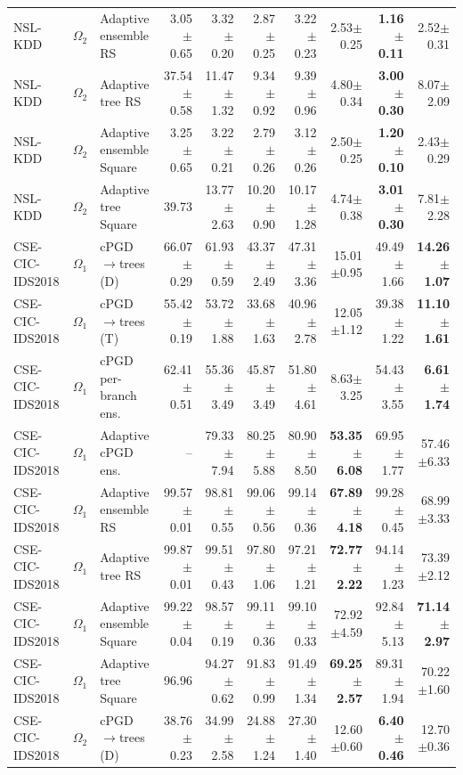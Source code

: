 \begin{tabular}{@{}lllrrrrrrr@{}}
NSL-KDD & $\Omega_2$ & Adaptive ensemble RS & 3.05$\pm$0.65 & 3.32$\pm$0.20 & 2.87$\pm$0.25 & 3.22$\pm$0.23 & 2.53$\pm$0.25 & \textbf{1.16$\pm$0.11} & 2.52$\pm$0.31\\
NSL-KDD & $\Omega_2$ & Adaptive tree RS & 37.54$\pm$0.58 & 11.47$\pm$1.32 & 9.34$\pm$0.92 & 9.39$\pm$0.96 & 4.80$\pm$0.34 & \textbf{3.00$\pm$0.30} & 8.07$\pm$2.09\\
NSL-KDD & $\Omega_2$ & Adaptive ensemble Square & 3.25$\pm$0.65 & 3.22$\pm$0.21 & 2.79$\pm$0.26 & 3.12$\pm$0.26 & 2.50$\pm$0.25 & \textbf{1.20$\pm$0.10} & 2.43$\pm$0.29\\
NSL-KDD & $\Omega_2$ & Adaptive tree Square & 39.73 & 13.77$\pm$2.63 & 10.20$\pm$0.90 & 10.17$\pm$1.28 & 4.74$\pm$0.38 & \textbf{3.01$\pm$0.30} & 7.81$\pm$2.28\\
\midrule
CSE-CIC-IDS2018 & $\Omega_1$ & cPGD$\to$trees (D) & 66.07$\pm$0.29 & 61.93$\pm$0.59 & 43.37$\pm$2.49 & 47.31$\pm$3.36 & 15.01$\pm$0.95 & 49.49$\pm$1.66 & \textbf{14.26$\pm$1.07}\\
CSE-CIC-IDS2018 & $\Omega_1$ & cPGD$\to$trees (T) & 55.42$\pm$0.19 & 53.72$\pm$1.88 & 33.68$\pm$1.63 & 40.96$\pm$2.78 & 12.05$\pm$1.12 & 39.38$\pm$1.22 & \textbf{11.10$\pm$1.61}\\
CSE-CIC-IDS2018 & $\Omega_1$ & cPGD per-branch ens. & 62.41$\pm$0.51 & 55.36$\pm$3.49 & 45.87$\pm$3.49 & 51.80$\pm$4.61 & 8.63$\pm$3.25 & 54.43$\pm$3.55 & \textbf{6.61$\pm$1.74}\\
CSE-CIC-IDS2018 & $\Omega_1$ & Adaptive cPGD ens. & -- & 79.33$\pm$7.94 & 80.25$\pm$5.88 & 80.90$\pm$8.50 & \textbf{53.35$\pm$6.08} & 69.95$\pm$1.77 & 57.46$\pm$6.33\\
CSE-CIC-IDS2018 & $\Omega_1$ & Adaptive ensemble RS & 99.57$\pm$0.01 & 98.81$\pm$0.55 & 99.06$\pm$0.56 & 99.14$\pm$0.36 & \textbf{67.89$\pm$4.18} & 99.28$\pm$0.45 & 68.99$\pm$3.33\\
CSE-CIC-IDS2018 & $\Omega_1$ & Adaptive tree RS & 99.87$\pm$0.01 & 99.51$\pm$0.43 & 97.80$\pm$1.06 & 97.21$\pm$1.21 & \textbf{72.77$\pm$2.22} & 94.14$\pm$1.23 & 73.39$\pm$2.12\\
CSE-CIC-IDS2018 & $\Omega_1$ & Adaptive ensemble Square & 99.22$\pm$0.04 & 98.57$\pm$0.19 & 99.11$\pm$0.36 & 99.10$\pm$0.33 & 72.92$\pm$4.59 & 92.84$\pm$5.13 & \textbf{71.14$\pm$2.97}\\
CSE-CIC-IDS2018 & $\Omega_1$ & Adaptive tree Square & 96.96 & 94.27$\pm$0.62 & 91.83$\pm$0.99 & 91.49$\pm$1.34 & \textbf{69.25$\pm$2.57} & 89.31$\pm$1.94 & 70.22$\pm$1.60\\
CSE-CIC-IDS2018 & $\Omega_2$ & cPGD$\to$trees (D) & 38.76$\pm$0.23 & 34.99$\pm$2.58 & 24.88$\pm$1.24 & 27.30$\pm$1.40 & 12.60$\pm$0.60 & \textbf{6.40$\pm$0.46} & 12.70$\pm$0.36\\

\end{tabular}
